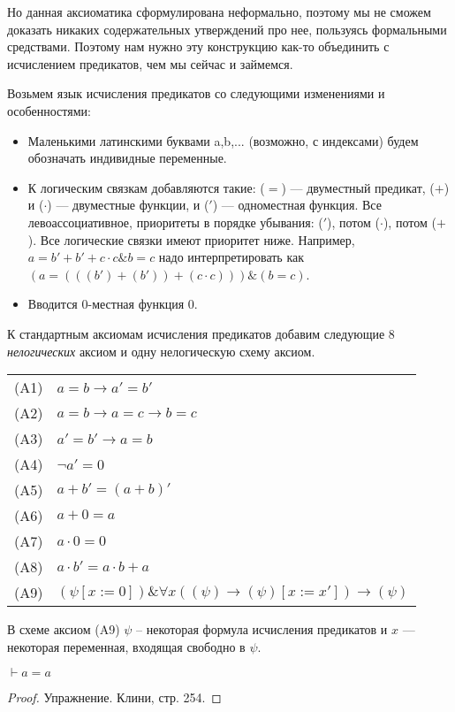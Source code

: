 Но данная аксиоматика сформулирована неформально, поэтому мы не сможем
доказать никаких содержательных утверждений про нее, пользуясь формальными
средствами. Поэтому нам нужно эту конструкцию как-то объединить с исчислением
предикатов, чем мы сейчас и займемся.

Возьмем язык исчисления предикатов со следующими изменениями и особенностями:
\begin{itemize}
\item Маленькими латинскими буквами a,b,... (возможно, с индексами) будем обозначать индивидные переменные.
\item К логическим связкам добавляются такие: ($=$) --- двуместный предикат, ($+$) и ($\cdot$)
--- двуместные функции, и ($'$) --- одноместная функция. Все левоассоциативное, приоритеты в порядке убывания:
($'$), потом ($\cdot$), потом ($+$). Все логические связки имеют приоритет ниже.
Например, $a= b'+b'+c \cdot c \& b = c$ надо интерпретировать как $(a = (((b') + (b')) + (c \cdot c))) \& (b = c)$.
\item Вводится 0-местная функция $0$.
\end{itemize}

К стандартным аксиомам исчисления предикатов добавим следующие 8 
\emph{нелогических} аксиом и одну нелогическую схему аксиом.

\begin{tabular}{ll}
(A1) & $a = b \rightarrow a' = b'$\\
(A2) & $a = b \rightarrow a = c \rightarrow b = c$\\
(A3) & $a' = b' \rightarrow a = b$\\
(A4) & $\neg a' = 0$\\
(A5) & $a + b' = (a+b)'$\\
(A6) & $a + 0 = a$\\
(A7) & $a \cdot 0 = 0$\\
(A8) & $a \cdot b' = a \cdot b + a$\\
(A9) & $(\psi [x := 0]) \& \forall{x}((\psi) \rightarrow (\psi) [x := x']) \rightarrow (\psi)$
\end{tabular}

В схеме аксиом (A9) $\psi$ -- некоторая формула исчисления предикатов и $x$ --- некоторая
переменная, входящая свободно в $\psi$.

\begin{theorem}
$\vdash a = a$
\end{theorem}
\begin{proof}
Упражнение. Клини, стр. 254.
\end{proof}

